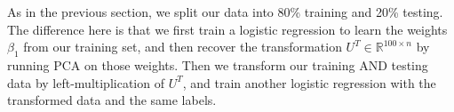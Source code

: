 \documentclass[11pt,a4paper]{article}
\begin{document}
As in the previous section, we split our data into 80\% training and 20\% testing. The difference here is that we first train a logistic regression to learn the weights $\beta_1$ from our training set, and then recover the transformation $U^T \in \mathbb{R}^{100 \times n}$ by running PCA on those weights. Then we transform our training AND testing data by left-multiplication of $U^T$, and train another logistic regression with the transformed data and the same labels. 
\end{document}

